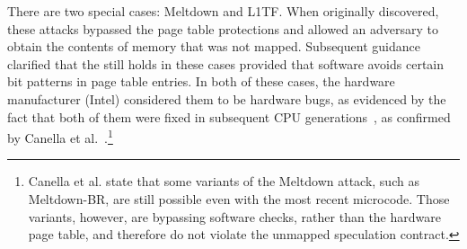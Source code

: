 There are two special cases:
Meltdown and L1TF.  When originally discovered, these attacks bypassed
the page table protections and allowed an adversary to obtain the
contents of memory that was not mapped.
Subsequent guidance clarified that the \contract still holds in these
cases provided that software avoids certain bit patterns in page table entries.
In both of these cases, the
hardware manufacturer (Intel) considered them to be hardware bugs, as
evidenced by the fact that both of them were fixed in subsequent CPU generations~\cite{intel:meltdown, intel:l1tf}, as confirmed by
Canella et al.~\cite{sok:transient}.\footnote{Canella et al. state that
some variants of the Meltdown attack, such as Meltdown-BR, are still
possible even with the most recent microcode.  Those variants, however,
are bypassing software checks, rather than the hardware page table, and
therefore do not violate the unmapped speculation contract.}


